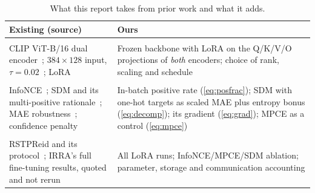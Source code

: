 \begin{table}[t]
\centering
\caption{What this report takes from prior work and what it adds.}
\label{tab:contrib}
\footnotesize
\setlength{\tabcolsep}{3pt}
\begin{tabularx}{\columnwidth}{@{}>{\raggedright\arraybackslash}p{}>{\raggedright\arraybackslash}X@{}}
\toprule
\textbf{Existing (source)} & \textbf{Ours} \\
\midrule
\multicolumn{2}{@{}l}{\textit{Model}}\\
CLIP ViT-B/16 dual encoder~\cite{radford2021learningtransferablevisualmodels}; $384{\times}128$ input, $\tau{=}0.02$~\cite{jiang2023crossmodalimplicitrelationreasoning}; LoRA~\cite{hu2021loralowrankadaptationlarge} & Frozen backbone with LoRA on the Q/K/V/O projections of \emph{both} encoders; choice of rank, scaling and schedule \\
\addlinespace
\multicolumn{2}{@{}l}{\textit{Theory}}\\
InfoNCE~\cite{oord2019representationlearningcontrastivepredictive}; SDM and its multi-positive rationale~\cite{jiang2023crossmodalimplicitrelationreasoning}; MAE robustness~\cite{ghosh2017robustlossfunctionslabel}; confidence penalty~\cite{pereyra2017regularizingneuralnetworkspenalizing} & In-batch positive rate (\cref{eq:posfrac}); SDM with one-hot targets as scaled MAE plus entropy bonus (\cref{eq:decomp}); its gradient (\cref{eq:grad}); MPCE as a control (\cref{eq:mpce}) \\
\addlinespace
\multicolumn{2}{@{}l}{\textit{Experiments}}\\
RSTPReid and its protocol~\cite{Zhu_2021}; IRRA's full fine-tuning results, quoted and not rerun~\cite{jiang2023crossmodalimplicitrelationreasoning} & All LoRA runs; InfoNCE/MPCE/SDM ablation; parameter, storage and communication accounting \\
\bottomrule
\end{tabularx}
\end{table}
